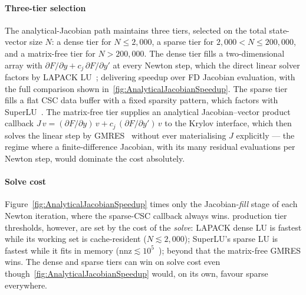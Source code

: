 \paragraph*{Three-tier selection} The analytical-Jacobian path
maintains three tiers, selected on the total state-vector size $N$: a
dense tier for $N\le2{,}000$, a sparse tier for
$2{,}000<N\le200{,}000$, and a matrix-free tier for $N>200{,}000$. The dense tier
fills a two-dimensional \NumPy{}~\cite{harris2020numpy} array with $\partial F/\partial y +
c_j\,\partial F/\partial y'$ at every Newton step, which the \SUNDIALS{}
direct linear solver factors by LAPACK LU~\cite{andersonlapack1999}; delivering
speedup over FD Jacobian
evaluation, with the full comparison shown
in~\cref{fig:AnalyticalJacobianSpeedup}. The sparse tier fills a flat
CSC data buffer with a fixed sparsity
pattern, which \SUNDIALS{} factors with
SuperLU~\cite{demmel1999supernodal,demmel1999superlumt}.
The matrix-free tier supplies an analytical
Jacobian--vector product callback $J\,v = (\partial F/\partial y)\,v +
c_j\,(\partial F/\partial y')\,v$ to the \SUNDIALS{} Krylov interface,
which then solves the linear step by GMRES~\cite{saad1986gmres}
without ever materialising $J$ explicitly --- the regime where a
finite-difference Jacobian, with its many residual evaluations per
Newton step, would dominate the cost absolutely.

\paragraph*{Solve cost}
Figure~\ref{fig:AnalyticalJacobianSpeedup} times only the
Jacobian-\emph{fill} stage of each Newton iteration, where the
sparse-CSC callback always wins.
production tier thresholds, however, are set by the cost of the
\emph{solve}: LAPACK dense LU is
fastest while its working set is cache-resident
($N\!\lesssim\!2{,}000$); SuperLU's sparse LU is fastest while it
fits in memory ($\mathrm{nnz}\!\lesssim\!10^{5}$~\cite{demmel1999superlumt,demmel1999supernodal});
beyond that the matrix-free GMRES wins.
The dense and sparse tiers can win on solve cost
even though~\cref{fig:AnalyticalJacobianSpeedup} would, on its own,
favour sparse everywhere.

